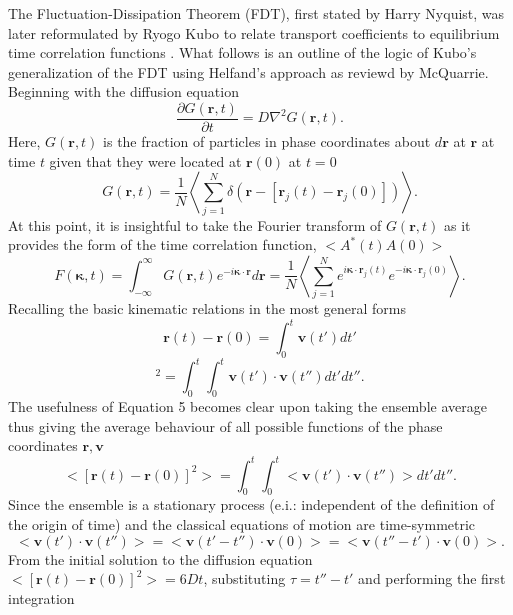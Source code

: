 The Fluctuation-Dissipation Theorem (FDT), first stated by Harry Nyquist, was later reformulated by Ryogo Kubo to relate transport coefficients to equilibrium time correlation functions \cite{JPSJ.12.570}. What follows is an outline of the logic of Kubo's generalization of the FDT using Helfand's approach as reviewd by McQuarrie\cite{mcquarrie}. Beginning with the diffusion equation
%
\begin{equation}
\frac{\partial G(\bm{r},t)}{\partial t}= D \nabla ^2G(\bm{r},t).
\end{equation}
%
Here, $G(\bm{r},t)$ is the fraction of particles in phase coordinates about $d\bm{r}$ at $\bm{r}$ at time $t$ given that they were located at $\bm{r}(0)$ at $t=0$
%
\begin{equation}
G(\bm{r},t)= \frac{1}{N}\left<\sum_{j=1}^N\delta(\bm{r}-[\bm{r}_j(t)-\bm{r}_j(0)])\right>.
\end{equation}
%
At this point, it is insightful to take the Fourier transform of $G(\bm{r},t)$ as it provides the form of the time correlation function, $<A^*(t)A(0)>$
%
\begin{equation}
F(\bm{\kappa},t)=\int_{-\infty}^{\infty}G(\bm{r},t)e^{-i\bm{\kappa}\cdot\bm{r}}d\bm{r}=\frac{1}{N}\left<\sum_{j=1}^Ne^{i\bm{\kappa}\cdot\bm{r}_j(t)}e^{-i\bm{\kappa}\cdot\bm{r}_j(0)}\right>.
\end{equation}
%
Recalling the basic kinematic relations in the most general forms
%
\begin{equation}
\bm{r}(t)-\bm{r}(0)=\int_0^t \bm{v}(t')dt'
\end{equation}
\begin{equation}
[\bm{r}(t)-\bm{r}(0)]^2=\int_0^t \int_0^t \bm{v}(t')\cdot\bm{v}(t'')dt'dt''.
\end{equation}
%
The usefulness of Equation 5 becomes clear upon taking the ensemble average thus giving the average behaviour of all possible functions of the phase coordinates $\bm{r},\bm{v}$
%
\begin{equation}
<[\bm{r}(t)-\bm{r}(0)]^2>=\int_0^t \int_0^t <\bm{v}(t')\cdot\bm{v}(t'')>dt'dt''.
\end{equation}
%
Since the ensemble is a stationary process (e.i.: independent of the definition of the origin of time) and the classical equations of motion are time-symmetric
%
\begin{equation}
<\bm{v}(t')\cdot\bm{v}(t'')>=<\bm{v}(t'-t'')\cdot\bm{v}(0)>=<\bm{v}(t''-t')\cdot\bm{v}(0)>.
\end{equation}
%
From the initial solution to the diffusion equation $<[\bm{r}(t)-\bm{r}(0)]^2>=6Dt$, substituting $\tau=t''-t'$ and performing the first integration
